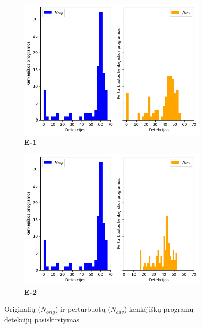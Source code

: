 \label{app:experiment}
\begin{figure}[h]
    \begin{small}
        \begin{center}
            \begin{subfigure}[t]{0.48\textwidth}
                \centering
                \includegraphics[width=\textwidth]{img/det_distributions_paper.png}
                \caption{\textbf{E-1}}
            \end{subfigure}
            \hfill
            \begin{subfigure}[t]{0.48\textwidth}
                \centering
                \includegraphics[width=\textwidth]{img/det_distributions.png}
                \caption{\textbf{E-2}}
            \end{subfigure}
        \end{center}
        \caption{Originalių ($N_{orig}$) ir perturbuotų ($N_{adv}$) kenkėjiškų programų detekcijų pasiskirstymas}\label{fig:experiment:det_dist}
    \end{small}
\end{figure}
